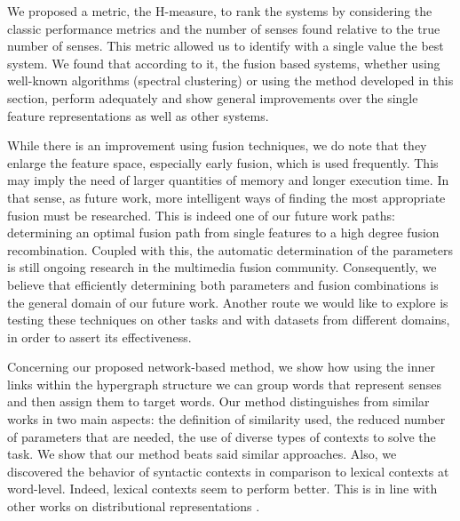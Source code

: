 We proposed a metric, the H-measure, to rank the systems by considering the classic performance metrics and the number of senses found relative to the true number of senses. This metric allowed us to identify with a single value the best system. We found that according to it, the fusion based systems, whether using well-known algorithms (spectral clustering) or using the method developed in this section, perform adequately and show general improvements over the single feature representations as well as other systems.

While there is an improvement using fusion techniques, we do note that they  enlarge the feature space, especially early fusion, which is used frequently. This may imply the need of larger quantities of memory and longer execution time. In that sense, as future work, more intelligent ways of finding the most appropriate fusion must be researched. This is indeed one of our future work paths: determining an optimal fusion path from single features to a high degree fusion recombination. Coupled with this, the automatic determination of the parameters is still ongoing research in the multimedia fusion community. Consequently, we believe that efficiently determining both parameters and fusion combinations is the general domain of our future work. Another route we would like to explore is testing these techniques on other tasks and with datasets from different domains, in order to assert its effectiveness.


Concerning our proposed network-based method, we show how using the inner links within the hypergraph structure we can group words that represent senses and then assign them to target words. Our method distinguishes from similar works in two main aspects: the definition of similarity used, the reduced number of parameters that are needed, the use of diverse types of contexts to solve the task. 	We show that our method beats said similar approaches. Also, we discovered the behavior of syntactic contexts in comparison to lexical contexts at word-level. Indeed, lexical contexts seem to perform better. This is in line with other works on distributional representations \cite{kiela2014systematic}.




